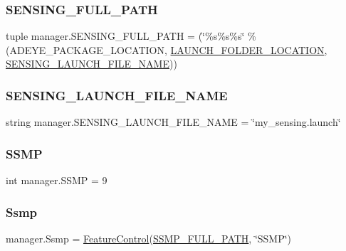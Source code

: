 \subsubsection{\texorpdfstring{S\+E\+N\+S\+I\+N\+G\+\_\+\+F\+U\+L\+L\+\_\+\+P\+A\+TH}{SENSING\_FULL\_PATH}}
{\footnotesize\ttfamily tuple manager.\+S\+E\+N\+S\+I\+N\+G\+\_\+\+F\+U\+L\+L\+\_\+\+P\+A\+TH = (\char`\"{}\%s\%s\%s\char`\"{} \% (A\+D\+E\+Y\+E\+\_\+\+P\+A\+C\+K\+A\+G\+E\+\_\+\+L\+O\+C\+A\+T\+I\+ON, \hyperlink{namespacemanager_aade405cb0881d91b45085d7bc0f392fa}{L\+A\+U\+N\+C\+H\+\_\+\+F\+O\+L\+D\+E\+R\+\_\+\+L\+O\+C\+A\+T\+I\+ON}, \hyperlink{namespacemanager_a368d806bbf5be8e72604353b971871d5}{S\+E\+N\+S\+I\+N\+G\+\_\+\+L\+A\+U\+N\+C\+H\+\_\+\+F\+I\+L\+E\+\_\+\+N\+A\+ME}))}

\mbox{\label{namespacemanager_a368d806bbf5be8e72604353b971871d5}} 
\subsubsection{\texorpdfstring{S\+E\+N\+S\+I\+N\+G\+\_\+\+L\+A\+U\+N\+C\+H\+\_\+\+F\+I\+L\+E\+\_\+\+N\+A\+ME}{SENSING\_LAUNCH\_FILE\_NAME}}
{\footnotesize\ttfamily string manager.\+S\+E\+N\+S\+I\+N\+G\+\_\+\+L\+A\+U\+N\+C\+H\+\_\+\+F\+I\+L\+E\+\_\+\+N\+A\+ME = \char`\"{}my\+\_\+sensing.\+launch\char`\"{}}

\mbox{\label{namespacemanager_a7c64b0011b346aa00685017ed03a6b72}} 
\subsubsection{\texorpdfstring{S\+S\+MP}{SSMP}}
{\footnotesize\ttfamily int manager.\+S\+S\+MP = 9}

\mbox{\label{namespacemanager_ab361294ddc773bf76e3a2d514a9649d0}} 
\subsubsection{\texorpdfstring{Ssmp}{Ssmp}}
{\footnotesize\ttfamily manager.\+Ssmp = \hyperlink{classFeatureControl_1_1FeatureControl}{Feature\+Control}(\hyperlink{namespacemanager_af8b394f3a0664a2eb78bb3c7ec36dd97}{S\+S\+M\+P\+\_\+\+F\+U\+L\+L\+\_\+\+P\+A\+TH}, \char`\"{}S\+S\+MP\char`\"{})}

